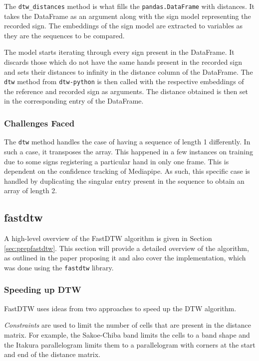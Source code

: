 \documentclass[final,rdr32.tex]{subfiles}
\begin{document}
The \verb|dtw_distances| method is what fills the \verb|pandas.DataFrame| with distances. It takes the DataFrame as an argument along with the sign model representing the recorded sign. The embeddings of the sign model are extracted to variables as they are the sequences to be compared.

The model starts iterating through every sign present in the DataFrame. It discards those which do not have the same hands present in the recorded sign and sets their distances to infinity in the distance column of the DataFrame. The \verb|dtw| method from \verb|dtw-python| \cite{giorgino2009computing} is then called with the respective embeddings of the reference and recorded sign as arguments. The distance obtained is then set in the corresponding entry of the DataFrame.


\subsubsection{Challenges Faced}

The \verb|dtw| method handles the case of having a sequence of length 1 differently. In such a case, it transposes the array. This happened in a few instances on training due to some signs registering a particular hand in only one frame. This is dependent on the confidence tracking of Mediapipe. As such, this specific case is handled by duplicating the singular entry present in the sequence to obtain an array of length 2.

\subsection{fastdtw}
\label{sec:fastdtw}
A high-level overview of the FastDTW algorithm is given in Section \ref{sec:prepfastdtw}. This section will provide a detailed overview of the algorithm, as outlined in the paper proposing it \cite{salvador2007toward} and also cover the implementation, which was done using the \verb|fastdtw| library.

\subsubsection{Speeding up DTW}

FastDTW uses ideas from two approaches to speed up the DTW algorithm.

\textit{Constraints} are used to limit the number of cells that are present in the distance matrix. For example, the Sakoe-Chiba band \cite{sakoe1978dynamic} limits the cells to a band shape and the Itakura parallelogram \cite{itakura1975minimum} limits them to a parallelogram with corners at the start and end of the distance matrix.
\end{document}

